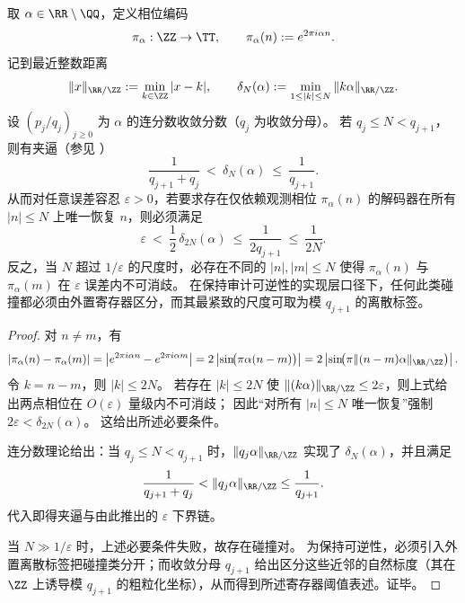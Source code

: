 \begin{theorem}\label{thm:cdim-phase-diophantine-resolution-lower-bound}
取 \(\alpha\in\RR\setminus\QQ\)，定义相位编码
\[
\pi_\alpha:\ZZ\to \TT,\qquad \pi_\alpha(n):=e^{2\pi i\alpha n}.
\]
记到最近整数距离
\[
\|x\|_{\RR/\ZZ}:=\min_{k\in\ZZ}|x-k|,
\qquad
\delta_N(\alpha):=\min_{1\le |k|\le N}\|k\alpha\|_{\RR/\ZZ}.
\]
设 \((p_j/q_j)_{j\ge 0}\) 为 \(\alpha\) 的连分数收敛分数（\(q_j\) 为收敛分母）。
若 \(q_j\le N<q_{j+1}\)，则有夹逼（参见 \cite{Cassels1957}）
\[
\frac{1}{q_{j+1}+q_j}\ <\ \delta_N(\alpha)\ \le\ \frac{1}{q_{j+1}}.
\]
从而对任意误差容忍 \(\varepsilon>0\)，若要求存在仅依赖观测相位 \(\pi_\alpha(n)\) 的解码器在所有 \(|n|\le N\) 上唯一恢复 \(n\)，则必须满足
\[
\varepsilon\ <\ \frac12\,\delta_{2N}(\alpha)
\ \le\ \frac{1}{2q_{j+1}}
\ \le\ \frac{1}{2N}.
\]
反之，当 \(N\) 超过 \(1/\varepsilon\) 的尺度时，必存在不同的 \(|n|,|m|\le N\) 使得 \(\pi_\alpha(n)\) 与 \(\pi_\alpha(m)\) 在 \(\varepsilon\) 误差内不可消歧。
在保持审计可逆性的实现层口径下，任何此类碰撞都必须由外置寄存器区分，而其最紧致的尺度可取为模 \(q_{j+1}\) 的离散标签。
\end{theorem}
\begin{proof}
对 \(n\neq m\)，有
\[
|\pi_\alpha(n)-\pi_\alpha(m)|
=\left|e^{2\pi i\alpha n}-e^{2\pi i\alpha m}\right|
=2\left|\sin\!\bigl(\pi\alpha(n-m)\bigr)\right|
=2\left|\sin\!\bigl(\pi\| (n-m)\alpha\|_{\RR/\ZZ}\bigr)\right|.
\]
令 \(k=n-m\)，则 \(|k|\le 2N\)。
若存在 \(|k|\le 2N\) 使 \(\|(k\alpha)\|_{\RR/\ZZ}\le 2\varepsilon\)，则上式给出两点相位在 \(O(\varepsilon)\) 量级内不可消歧；
因此“对所有 \(|n|\le N\) 唯一恢复”强制
\(
2\varepsilon<\delta_{2N}(\alpha)
\)。
这给出所述必要条件。
\par
连分数理论给出：当 \(q_j\le N<q_{j+1}\) 时，\(\|q_j\alpha\|_{\RR/\ZZ}\) 实现了 \(\delta_N(\alpha)\)，并且满足
\[
\frac{1}{q_{j+1}+q_j}<\|q_j\alpha\|_{\RR/\ZZ}\le \frac{1}{q_{j+1}}.
\]
代入即得夹逼与由此推出的 \(\varepsilon\) 下界链。
\par
当 \(N\gg 1/\varepsilon\) 时，上述必要条件失败，故存在碰撞对。
为保持可逆性，必须引入外置离散标签把碰撞类分开；而收敛分母 \(q_{j+1}\) 给出区分这些近邻的自然标度（其在 \(\ZZ\) 上诱导模 \(q_{j+1}\) 的粗粒化坐标），从而得到所述寄存器阈值表述。证毕。
\end{proof}

